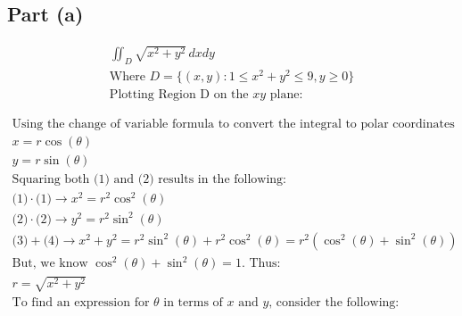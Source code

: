 \documentclass[letterpaper,10pt]{article}
\begin{document}
		\subsection{Part (a)}
			\begin{center}
			\begin{gather*}
				\iint_D \sqrt{x^2+y^2} \, dxdy \\
				\text{Where } D = \{ (x,y) : 1 \leq x^2+y^2 \leq 9, y \geq 0 \} \\
				\text{Plotting Region D on the $xy$ plane:}
			\end{gather*}
			\begin{gather*}
				\text{Using the change of variable formula to convert the integral to polar coordinates using:} \\
				x = r\cos{(\theta)} \tag{1} \\
				y = r\sin{(\theta)} \tag{2} \\
				\text{Squaring both (1) and (2) results in the following:} \\
				\text{(1)} \cdot \text{(1)} \rightarrow x^2 = r^2 \cos^2{(\theta)} \tag{3} \\
				\text{(2)} \cdot \text{(2)} \rightarrow y^2 = r^2 \sin^2{(\theta)} \tag{4} \\
				\text{(3)} + \text{(4)} \rightarrow x^2 + y^2 = r^2 \sin^2{(\theta)} + r^2 \cos^2{(\theta)} = r^2(\cos^2{(\theta)} + \sin^2{(\theta)}) \\
				\text{But, we know $\cos^2{(\theta)} + \sin^2{(\theta)} = 1$. Thus:} \\
				r = \sqrt{x^2 + y^2} \\
				\text{To find an expression for $\theta$ in terms of $x$ and $y$, consider the following:} \\

\end{gather*}
\end{center}
\end{document}
